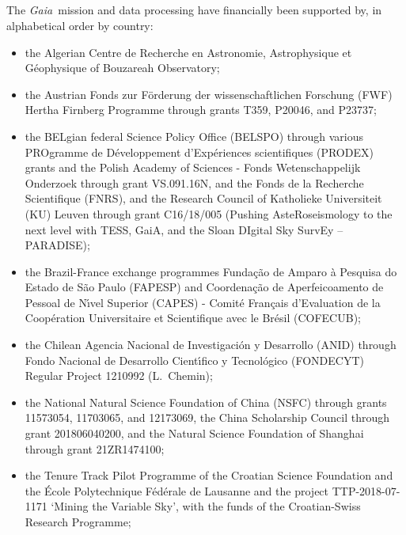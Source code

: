 \documentclass[longauth]{aa}
\newcommand\gaia{\textit{Gaia}\xspace}
\begin{document}


\begin{appendix}
\section{}\label{ssec:appendixA}
The \gaia\ mission and data processing have financially been supported by, in alphabetical order by country:
\begin{itemize}
\item the Algerian Centre de Recherche en Astronomie, Astrophysique et G\'{e}ophysique of Bouzareah Observatory;
\item the Austrian Fonds zur F\"{o}rderung der wissenschaftlichen Forschung (FWF) Hertha Firnberg Programme through grants T359, P20046, and P23737;
\item the BELgian federal Science Policy Office (BELSPO) through various PROgramme de D\'{e}veloppement d'Exp\'{e}riences scientifiques (PRODEX) grants and the Polish Academy of Sciences - Fonds Wetenschappelijk Onderzoek through grant VS.091.16N, and the Fonds de la Recherche Scientifique (FNRS), and the Research Council of Katholieke Universiteit (KU) Leuven through grant C16/18/005 (Pushing AsteRoseismology to the next level with TESS, GaiA, and the Sloan DIgital Sky SurvEy -- PARADISE);  
\item the Brazil-France exchange programmes Funda\c{c}\~{a}o de Amparo \`{a} Pesquisa do Estado de S\~{a}o Paulo (FAPESP) and Coordena\c{c}\~{a}o de Aperfeicoamento de Pessoal de N\'{\i}vel Superior (CAPES) - Comit\'{e} Fran\c{c}ais d'Evaluation de la Coop\'{e}ration Universitaire et Scientifique avec le Br\'{e}sil (COFECUB);
\item the Chilean Agencia Nacional de Investigaci\'{o}n y Desarrollo (ANID) through Fondo Nacional de Desarrollo Cient\'{\i}fico y Tecnol\'{o}gico (FONDECYT) Regular Project 1210992 (L.~Chemin);
\item the National Natural Science Foundation of China (NSFC) through grants 11573054, 11703065, and 12173069, the China Scholarship Council through grant 201806040200, and the Natural Science Foundation of Shanghai through grant 21ZR1474100;  
\item the Tenure Track Pilot Programme of the Croatian Science Foundation and the \'{E}cole Polytechnique F\'{e}d\'{e}rale de Lausanne and the project TTP-2018-07-1171 `Mining the Variable Sky', with the funds of the Croatian-Swiss Research Programme;

\end{itemize}
\end{appendix}
\end{document}
